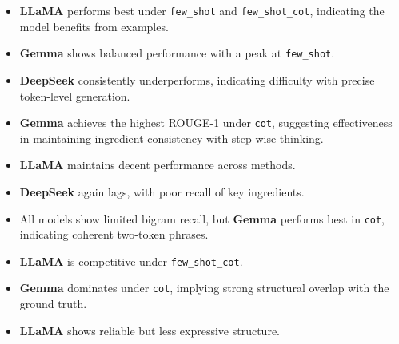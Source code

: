 \documentclass[letterpaper,11pt]{report}
\begin{document}
\begin{itemize}
  \item \textbf{LLaMA} performs best under \texttt{few\_shot} and \texttt{few\_shot\_cot}, indicating the model benefits from examples.
  \item \textbf{Gemma} shows balanced performance with a peak at \texttt{few\_shot}.
  \item \textbf{DeepSeek} consistently underperforms, indicating difficulty with precise token-level generation.
\end{itemize}

\begin{itemize}
  \item \textbf{Gemma} achieves the highest ROUGE-1 under \texttt{cot}, suggesting effectiveness in maintaining ingredient consistency with step-wise thinking.
  \item \textbf{LLaMA} maintains decent performance across methods.
  \item \textbf{DeepSeek} again lags, with poor recall of key ingredients.
\end{itemize}

\begin{itemize}
  \item All models show limited bigram recall, but \textbf{Gemma} performs best in \texttt{cot}, indicating coherent two-token phrases.
  \item \textbf{LLaMA} is competitive under \texttt{few\_shot\_cot}.
\end{itemize}

\begin{itemize}
  \item \textbf{Gemma} dominates under \texttt{cot}, implying strong structural overlap with the ground truth.
  \item \textbf{LLaMA} shows reliable but less expressive structure.
\end{itemize}
\end{document}
